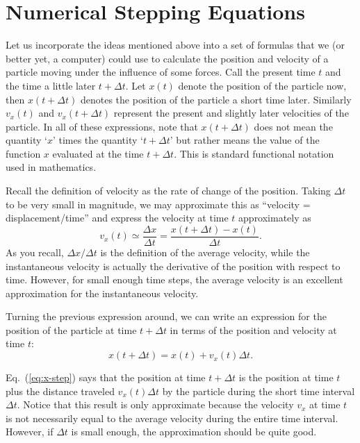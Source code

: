 \section{Numerical Stepping Equations}

Let us incorporate the ideas mentioned above into a set of formulas
that we (or better yet, a computer) could use to calculate the
position and velocity of a particle moving under the influence of some
forces.  Call the present time $t$ and the time a little later $t +
\Delta t$.  Let $x(t)$ denote the position of the particle now, then
$x(t + \Delta t)$ denotes the position of the particle a short time
later.  Similarly $v_x(t)$ and $v_x(t + \Delta t)$ represent the present
and slightly later velocities of the particle.  In all of these
expressions, note that $x(t + \Delta t)$ does not mean the quantity
`$x$' times the quantity `$t + \Delta t$' but rather means the value
of the function $x$ evaluated at the time $t + \Delta t$.  This is
standard functional notation used in mathematics.

Recall the definition of velocity as the rate of change of the
position.  Taking $\Delta t$ to be very small in magnitude, we may
approximate this as ``velocity = displacement/time'' and
express the velocity at time $t$ approximately as
\begin{equation}
  v_x(t) \simeq \frac{\Delta x}{\Delta t} = \frac{x(t+\Delta t) - x(t)}
  {\Delta t}.
\end{equation}
As you recall, $\Delta x/\Delta t$ is the definition of the average
velocity, while the instantaneous velocity is actually the derivative
of the position with respect to time.  However, for small enough time
steps, the average velocity is an excellent approximation for the
instantaneous velocity.

Turning the previous expression around, we can write an expression for
the position of the particle at time $t + \Delta t$ in terms of the
position and velocity at time $t$:
\begin{equation}
  x(t+\Delta t) = x(t) + v_x(t)\Delta t.
  \label{eq:x-step}
\end{equation}

Eq.~(\ref{eq:x-step}) says that the position at time $t + \Delta t$ is
the position at time $t$ plus the distance traveled $v_x(t)\Delta t$ by
the particle during the short time interval $\Delta t$.  Notice that
this result is only approximate because the velocity $v_x$ at time $t$
is not necessarily equal to the average velocity during the entire
time interval.  However, if $\Delta t$ is small enough, the
approximation should be quite good.
   
